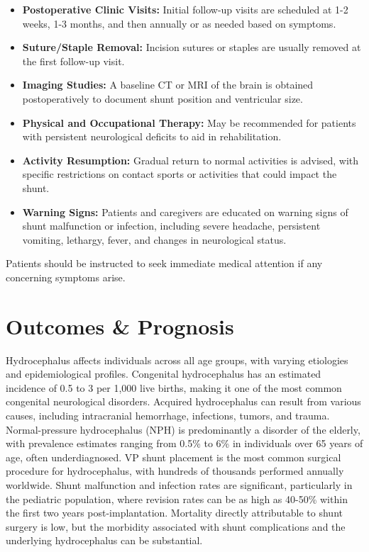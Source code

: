 \begin{itemize}
  \item \textbf{Postoperative Clinic Visits:} Initial follow-up visits are scheduled at 1-2 weeks, 1-3 months, and then annually or as needed based on symptoms.
  
  \item \textbf{Suture/Staple Removal:} Incision sutures or staples are usually removed at the first follow-up visit.
  
  \item \textbf{Imaging Studies:} A baseline CT or MRI of the brain is obtained postoperatively to document shunt position and ventricular size.
  
  \item \textbf{Physical and Occupational Therapy:} May be recommended for patients with persistent neurological deficits to aid in rehabilitation.
  
  \item \textbf{Activity Resumption:} Gradual return to normal activities is advised, with specific restrictions on contact sports or activities that could impact the shunt.
  
  \item \textbf{Warning Signs:} Patients and caregivers are educated on warning signs of shunt malfunction or infection, including severe headache, persistent vomiting, lethargy, fever, and changes in neurological status.
\end{itemize}

Patients should be instructed to seek immediate medical attention if any concerning symptoms arise.

\section*{Outcomes \& Prognosis}
Hydrocephalus affects individuals across all age groups, with varying etiologies and epidemiological profiles. Congenital hydrocephalus has an estimated incidence of 0.5 to 3 per 1,000 live births, making it one of the most common congenital neurological disorders. Acquired hydrocephalus can result from various causes, including intracranial hemorrhage, infections, tumors, and trauma. Normal-pressure hydrocephalus (NPH) is predominantly a disorder of the elderly, with prevalence estimates ranging from 0.5\% to 6\% in individuals over 65 years of age, often underdiagnosed. VP shunt placement is the most common surgical procedure for hydrocephalus, with hundreds of thousands performed annually worldwide. Shunt malfunction and infection rates are significant, particularly in the pediatric population, where revision rates can be as high as 40-50\% within the first two years post-implantation. Mortality directly attributable to shunt surgery is low, but the morbidity associated with shunt complications and the underlying hydrocephalus can be substantial.

